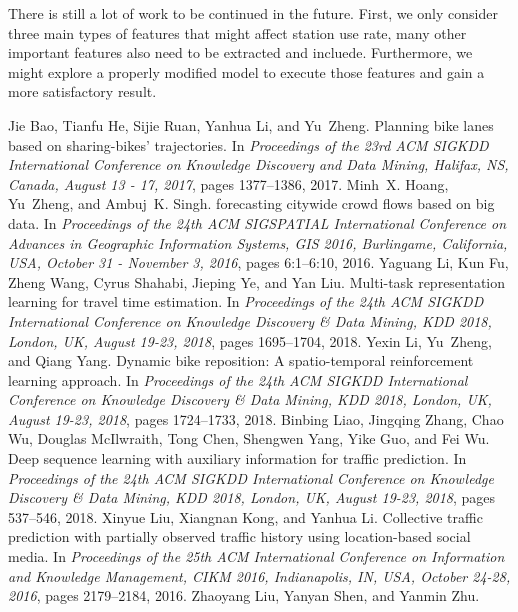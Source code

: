 \documentclass[conference]{IEEEtran}
\begin{document}
There is still a lot of work to be continued in the future. First, we only consider three main types of features that might affect station use rate, many other important features also need to be extracted and incluede. Furthermore, we might explore a properly modified model to execute those features and gain a more satisfactory result.


\begin{thebibliography}{00}
 Jie Bao, Tianfu He, Sijie Ruan, Yanhua Li, and Yu~Zheng.
\newblock Planning bike lanes based on sharing-bikes' trajectories.
\newblock In {\em Proceedings of the 23rd {ACM} {SIGKDD} International
	Conference on Knowledge Discovery and Data Mining, Halifax, NS, Canada,
	August 13 - 17, 2017}, pages 1377--1386, 2017.
 Minh~X. Hoang, Yu~Zheng, and Ambuj~K. Singh.
 forecasting citywide crowd flows based on big data.
\newblock In {\em Proceedings of the 24th {ACM} {SIGSPATIAL} International
	Conference on Advances in Geographic Information Systems, {GIS} 2016,
	Burlingame, California, USA, October 31 - November 3, 2016}, pages 6:1--6:10,
2016.
 Yaguang Li, Kun Fu, Zheng Wang, Cyrus Shahabi, Jieping Ye, and Yan Liu.
\newblock Multi-task representation learning for travel time estimation.
\newblock In {\em Proceedings of the 24th {ACM} {SIGKDD} International
	Conference on Knowledge Discovery {\&} Data Mining, {KDD} 2018, London, UK,
	August 19-23, 2018}, pages 1695--1704, 2018.
 Yexin Li, Yu~Zheng, and Qiang Yang.
\newblock Dynamic bike reposition: A spatio-temporal reinforcement learning
approach.
\newblock In {\em Proceedings of the 24th {ACM} {SIGKDD} International
	Conference on Knowledge Discovery {\&} Data Mining, {KDD} 2018, London, UK,
	August 19-23, 2018}, pages 1724--1733, 2018.
 Binbing Liao, Jingqing Zhang, Chao Wu, Douglas McIlwraith, Tong Chen, Shengwen
Yang, Yike Guo, and Fei Wu.
\newblock Deep sequence learning with auxiliary information for traffic
prediction.
\newblock In {\em Proceedings of the 24th {ACM} {SIGKDD} International
	Conference on Knowledge Discovery {\&} Data Mining, {KDD} 2018, London, UK,
	August 19-23, 2018}, pages 537--546, 2018.
 Xinyue Liu, Xiangnan Kong, and Yanhua Li.
\newblock Collective traffic prediction with partially observed traffic history
using location-based social media.
\newblock In {\em Proceedings of the 25th {ACM} International Conference on
	Information and Knowledge Management, {CIKM} 2016, Indianapolis, IN, USA,
	October 24-28, 2016}, pages 2179--2184, 2016.
 Zhaoyang Liu, Yanyan Shen, and Yanmin Zhu.

\end{thebibliography}
\end{document}
